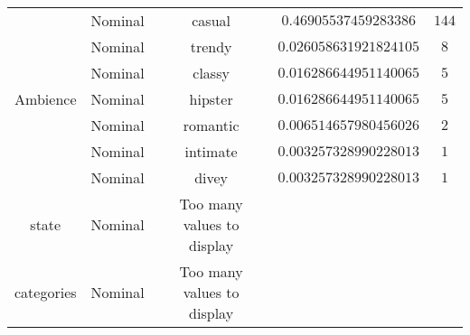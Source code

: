 \begin{tabular}{|c|c|c|c|c|}
\multirow{7}{*}{Ambience} & Nominal & casual & $0.46905537459283386$ & $144$ \\ \cline{2-4} 
 & Nominal & trendy & $0.026058631921824105$ & $8$ \\ \cline{2-4} 
 & Nominal & classy & $0.016286644951140065$ & $5$ \\ \cline{2-4} 
 & Nominal & hipster & $0.016286644951140065$ & $5$ \\ \cline{2-4} 
 & Nominal & romantic & $0.006514657980456026$ & $2$ \\ \cline{2-4} 
 & Nominal & intimate & $0.003257328990228013$ & $1$ \\ \cline{2-4} 
 & Nominal & divey & $0.003257328990228013$ & $1$ \\ \hline 
state & Nominal & Too many values to display & \\ \hline
categories & Nominal & Too many values to display & \\ \hline
\end{tabular}


